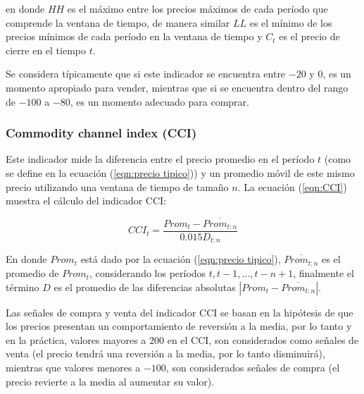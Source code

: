 \documentclass[12pt]{report}
\theoremstyle{break}
\theoremstyle{break}
\begin{document}
en donde $HH$ es el máximo entre los precios máximos de cada período que comprende la ventana de tiempo, de manera similar $LL$ es el mínimo de los precios mínimos de cada período en la ventana de tiempo y $C_t$ es el precio de cierre en el tiempo $t$.

Se considera típicamente que si este indicador se encuentra entre $-20$ y $0$, es un momento apropiado para vender, mientras que si se encuentra dentro del rango de $-100$ a $-80$, es un momento adecuado para comprar.

\subsubsection{Commodity channel index (CCI)}
\label{subsubseccion:cci}
Este indicador mide la diferencia entre el precio promedio en el período $t$ (como se define en la ecuación (\ref{eqn:precio tipico})) y un promedio móvil de este mismo precio utilizando una ventana de tiempo de tamaño $n$. La ecuación (\ref{eqn:CCI}) muestra el cálculo del indicador CCI:

\begin{equation} \label{eqn:CCI}
CCI_t = \dfrac{ Prom_t - \overline{Prom_{t:n}} }{ 0.015 D_{t:n}}
\end{equation}

En donde $Prom_t$ está dado por la ecuación (\ref{eqn:precio tipico}), $\overline{Prom_{t:n}}$ es el promedio de $Prom_t$, considerando los períodos $t, t-1, \ldots, t-n +1$, finalmente el término $D$ es el promedio de las diferencias absolutas $\left|Prom_t - \overline{Prom_{t:n}}  \right|$.

Las señales de compra y venta del indicador CCI se basan en la hipótesis de que los precios presentan un comportamiento de reversión a la media, por lo tanto y en la práctica, valores mayores a $200$ en el CCI, son considerados como señales de venta (el precio tendrá una reversión a la media, por lo tanto disminuirá), mientras que valores menores a $-100$, son considerados señales de compra (el precio revierte a la media al aumentar su valor).
\end{document}
